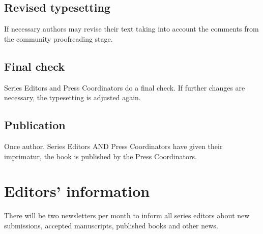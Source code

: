 \documentclass[ number=??
                ,series=lnls,
                ,isbn=000-0-000000-00-0,
                ,url=http://langsci-press.org/catalog/book/0,
	        ,output=long    %
	        ,draftmode  
		  ]{LSP/langsci}
\begin{document}

\subsection{Revised typesetting}

If necessary authors may revise their text taking into account the comments from the community proofreading stage.

\subsection{Final check}

Series Editors and Press Coordinators do a final check. If further changes are necessary, the
typesetting is adjusted again.


\subsection{Publication}

Once author, Series Editors AND Press Coordinators have given their imprimatur, the book is published by the Press Coordinators.


\section{Editors' information}
\label{sec-editors-information}

There will be two newsletters per month to inform all series editors about new submissions, accepted
manuscripts, published books and other news. 
\end{document}
